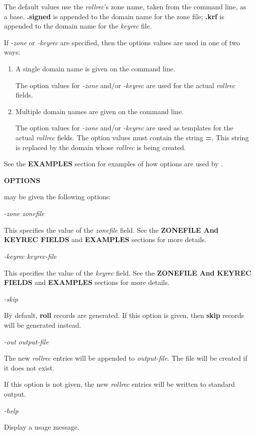 The default values use the {\it rollrec}'s zone name, taken from the command
line, as a base.  {\bf .signed} is appended to the domain name for the zone
file; {\bf .krf} is appended to the domain name for the {\it keyrec} file.

If {\it -zone} or {\it -keyrec} are specified, then the options values are
used in one of two ways:

\begin{enumerate}

\item A single domain name is given on the command line.\verb" "

The option values for {\it -zone} and/or {\it -keyrec} are used for the actual
{\it rollrec} fields.

\item Multiple domain names are given on the command line.\verb" "

The option values for {\it -zone} and/or {\it -keyrec} are used as templates
for the actual {\it rollrec} fields.  The option values must contain 
the string {\bf =}.  This string is replaced by the domain whose {\it rollrec}
is being created.

\end{enumerate}

See the {\bf EXAMPLES} section for examples of how options are used by
.

{\bf OPTIONS}

 may be given the following options:

\begin{description}

\item {\it -zone zonefile}\verb" "

This specifies the value of the {\it zonefile} field.
See the {\bf ZONEFILE And KEYREC FIELDS} and {\bf EXAMPLES} sections
for more details.

\item {\it -keyrec keyrec-file}\verb" "

This specifies the value of the {\it keyrec} field.
See the {\bf ZONEFILE And KEYREC FIELDS} and {\bf EXAMPLES} sections
for more details.

\item {\it -skip}\verb" "

By default, {\bf roll} records are generated.  If this option is given, then
{\bf skip} records will be generated instead.

\item {\it -out output-file}\verb" "

The new {\it rollrec} entries will be appended to {\it output-file}.
The file will be created if it does not exist.

If this option is not given, the new {\it rollrec} entries will be written
to standard output.

\item {\it -help}\verb" "

Display a usage message.

\end{description}

